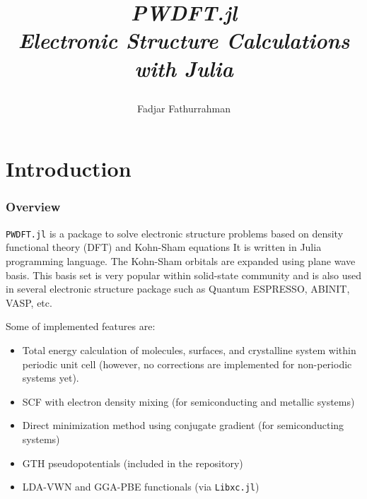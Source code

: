 \documentclass[a4paper,fleqn]{article}
\newcommand{\txtinline}[1]{\texttt{#1}}
\begin{document}
\title{
  \begin{center}{
    \Huge \textit{PWDFT.jl}}\\
    {{\itshape Electronic Structure Calculations with Julia}}
\end{center}
}
\author{Fadjar Fathurrahman}





\maketitle

\newpage
\part{Introduction}

\section{Overview}

\txtinline{PWDFT.jl} is a package to solve electronic structure problems
based on density functional theory (DFT) and Kohn-Sham equations
It is written in Julia programming language.
The Kohn-Sham orbitals are expanded using plane wave basis. This basis set is
very popular within solid-state community and is also used in several electronic
structure package such as Quantum ESPRESSO, ABINIT, VASP, etc.

Some of implemented features are:
\begin{itemize}
\item Total energy calculation of molecules, surfaces, and crystalline system
  within periodic unit cell (however, no corrections are 
  implemented for non-periodic systems yet).
\item SCF with electron density mixing (for semiconducting and metallic systems)
\item Direct minimization method using conjugate gradient (for semiconducting systems)
\item GTH pseudopotentials (included in the repository)
\item LDA-VWN and GGA-PBE functionals (via \txtinline{Libxc.jl})
\end{itemize}
\end{document}
